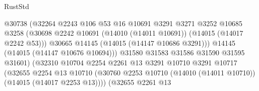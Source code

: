 \begin{lexlean}{RustStd}
\begin{coremodule}
                                            @30738
                                            (@32264
                                              @2243
                                              @106
                                              @53
                                              @16
                                              @10691
                                              @3291
                                              @3271
                                              @3252
                                              @10685
                                              @3258
                                              (@30698
                                                @2242
                                                @10691
                                                (@14010 (@14011 @10691))
                                                (@14015 (@14017 @2242 @53)))
                                              @30665
                                              @14145
                                              (@14015 (@14147 @10686 @3291)))
                                            @14145
                                            (@14015 (@14147 @10676 @10694)))
                                          @31580
                                          @31583
                                          @31586
                                          @31590
                                          @31595
                                          @31601)
                                        (@32310
                                          @10704
                                          @2254
                                          @2261
                                          @13
                                          @3291
                                          @10710
                                          @3291
                                          @10717
                                          (@32655
                                            @2254
                                            @13
                                            @10710
                                            (@30760
                                              @2253
                                              @10710
                                              (@14010 (@14011 @10710))
                                              (@14015 (@14017 @2253 @13))))
                                          (@32655
                                            @2261
                                            @13

\end{coremodule}
\end{lexlean}

